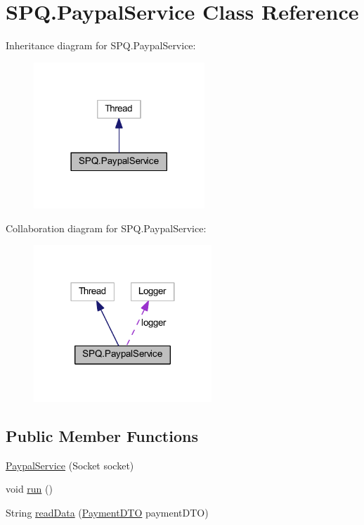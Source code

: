 \hypertarget{class_s_p_q_1_1_paypal_service}{}\section{S\+P\+Q.\+Paypal\+Service Class Reference}
\label{class_s_p_q_1_1_paypal_service}


Inheritance diagram for S\+P\+Q.\+Paypal\+Service\+:
\nopagebreak
\begin{figure}[H]
\begin{center}
\leavevmode
\includegraphics[width=182pt]{class_s_p_q_1_1_paypal_service__inherit__graph}
\end{center}
\end{figure}


Collaboration diagram for S\+P\+Q.\+Paypal\+Service\+:
\nopagebreak
\begin{figure}[H]
\begin{center}
\leavevmode
\includegraphics[width=190pt]{class_s_p_q_1_1_paypal_service__coll__graph}
\end{center}
\end{figure}
\subsection*{Public Member Functions}
\begin{DoxyCompactItemize}
\item 
\mbox{\hyperlink{class_s_p_q_1_1_paypal_service_a3cbaf105ed828689b48c82ec63527779}{Paypal\+Service}} (Socket socket)
\item 
void \mbox{\hyperlink{class_s_p_q_1_1_paypal_service_a05e65efee1bcfa26a215ea48b7c8696a}{run}} ()
\item 
String \mbox{\hyperlink{class_s_p_q_1_1_paypal_service_aae478af6069bf1ffa928b09f2a91328d}{read\+Data}} (\mbox{\hyperlink{class_s_p_q_1_1dto_1_1_payment_d_t_o}{Payment\+D\+TO}} payment\+D\+TO)
\end{DoxyCompactItemize}



